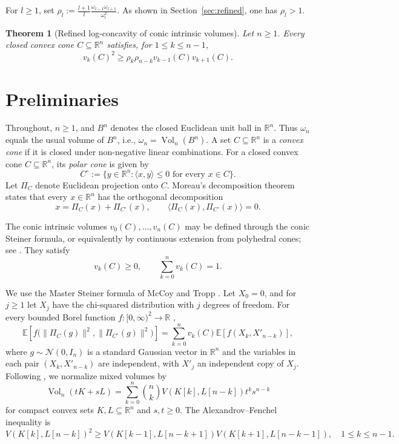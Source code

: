 \documentclass[12pt,a4paper]{article}
\numberwithin{equation}{section}
\newtheorem{theorem}{Theorem}[section]
\theoremstyle{definition}
\theoremstyle{remark}
\newcommand{\R}{\mathbb{R}}
\newcommand{\E}{\mathbb{E}}
\newcommand{\vol}{\operatorname{Vol}}
\begin{document}
For $l\ge1$, set
$\rho_l:=\frac{l+1}{l}
\frac{\omega_{l-1}\omega_{l+1}}{\omega_l^2}$.
As shown in Section~\ref{sec:refined}, one has $\rho_l>1$.

\begin{theorem}[Refined log-concavity of conic intrinsic volumes]
\label{thm:main-lc}
Let $n\ge1$.  Every closed convex cone $C\subseteq\R^n$ satisfies, for
$1\le k\le n-1$,
\begin{equation}\label{eq:intro-strong}
 v_k(C)^2\ge
 \rho_k\rho_{n-k}v_{k-1}(C)v_{k+1}(C).
\end{equation}
\end{theorem}

\section{Preliminaries}
Throughout, $n\ge1$, and $B^n$ denotes the closed Euclidean unit ball in $\R^n$. Thus $\omega_n$ equals the usual volume of $B^n$, i.e., $\omega_n=\vol_n(B^n)$. A set $C\subseteq \R^n$ is a \emph{convex cone} if it is closed under non-negative linear combinations. For a closed convex cone $C\subseteq\R^n$, its \emph{polar cone} is given by
\[
C^\circ:=\{y\in\R^n:\langle x,y\rangle\le0\text{ for every }x\in C\}.
\]
Let $\Pi_C$ denote Euclidean projection onto $C$.  Moreau's decomposition theorem \cite{Moreau} states that every $x\in\R^n$ has the orthogonal decomposition
\begin{equation}\label{eq:moreau}
 x=\Pi_C(x)+\Pi_{C^\circ}(x),\qquad\langle\Pi_C(x),\Pi_{C^\circ}(x)\rangle=0.
\end{equation}

The conic intrinsic volumes $v_0(C),\ldots,v_n(C)$ may be defined
through the conic Steiner formula, or equivalently by continuous
extension from polyhedral cones; see
\cite[Definition~2.2 and Section~8.2]{McCoyTropp}.  They satisfy
\[
 v_k(C)\ge0,\qquad
 \sum_{k=0}^n v_k(C)=1.
\]

We use the Master Steiner formula of McCoy and Tropp \cite[Theorem~3.1 and Corollary~3.2]{McCoyTropp}.  Let $X_0=0$, and for $j\ge1$ let
$X_j$ have the chi-squared distribution with $j$ degrees of freedom.
For every bounded Borel function $f:[0,\infty)^2\to\R$ ,
\begin{equation}\label{eq:master-Steiner}
 \E\left[f\bigl(\|\Pi_C(g)\|^2,\|\Pi_{C^\circ}(g)\|^2\bigr)\right]
 =\sum_{k=0}^n v_k(C)\E\left [f(X_k,X'_{n-k})\right],
\end{equation}
where $g\sim\mathcal{N}(0,I_n)$ is a standard Gaussian vector in $\R^n$ and the variables in each pair
$(X_k,X'_{n-k})$ are independent, with $X'_j$ an independent copy
of $X_j$.  Following \cite[(5.28)]{SchneiderConvexBodies}, we
normalize mixed volumes by
\begin{equation}\label{eq:mixed-expansion}
 \vol_n(tK+sL)
 =\sum_{k=0}^n\binom nk
 V(K[k],L[n-k])t^ks^{n-k}
\end{equation}
for compact convex sets $K,L\subseteq\R^n$ and $s,t\ge0$.
The Alexandrov--Fenchel inequality
\cite[Theorem 7.3.1]{SchneiderConvexBodies} is
\begin{equation}\label{eq:AF-prelim}
 V(K[k],L[n-k])^2\ge V(K[k-1],L[n-k+1])V(K[k+1],L[n-k-1]),\quad 1\le k\le n-1.
\end{equation}
\end{document}
